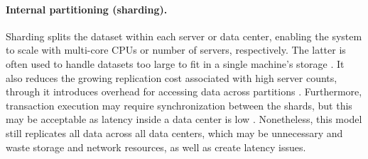 
\paragraph{Internal partitioning (sharding).}
Sharding splits the dataset within each server or data center, enabling the system to scale with multi-core CPUs or number of servers, respectively.
The latter is often used to handle datasets too large to fit in a single machine's storage \cite{clickhouse}.
It also reduces the growing replication cost associated with high server counts, through it introduces overhead for accessing data across partitions \cite{dynamo, cops, mdcc, epoch}. 
Furthermore, transaction execution may require synchronization between the shards, but this may be acceptable as latency inside a data center is low \cite{cops, mdcc, detock, h-store}.
Nonetheless, this model still replicates all data across all data centers, which may be unnecessary and waste storage and network resources, as well as create latency issues.


